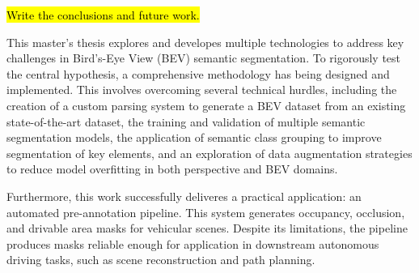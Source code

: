 
\hl{Write the conclusions and future work.}

This master's thesis explores and developes multiple technologies to address key challenges in Bird's-Eye View (BEV) semantic segmentation. To rigorously test the central hypothesis, a comprehensive methodology has being designed and implemented. This involves overcoming several technical hurdles, including the creation of a custom parsing system to generate a BEV dataset from an existing state-of-the-art dataset, the training and validation of multiple semantic segmentation models, the application of semantic class grouping to improve segmentation of key elements, and an exploration of data augmentation strategies to reduce model overfitting in both perspective and BEV domains.

Furthermore, this work successfully deliveres a practical application: an automated pre-annotation pipeline. This system generates occupancy, occlusion, and drivable area masks for vehicular scenes. Despite its limitations, the pipeline produces masks reliable enough for application in downstream autonomous driving tasks, such as scene reconstruction and path planning.

